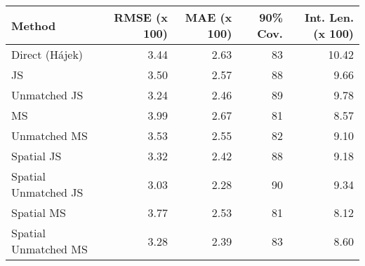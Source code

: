 
\begin{tabular}{lrrrr}
\toprule
Method & RMSE (x 100) & MAE (x 100) & 90\% Cov. & Int. Len. (x 100)\\
\midrule
Direct (Hájek) & 3.44 & 2.63 & 83 & 10.42\\
JS & 3.50 & 2.57 & 88 & 9.66\\
Unmatched JS & 3.24 & 2.46 & 89 & 9.78\\
MS & 3.99 & 2.67 & 81 & 8.57\\
Unmatched MS & 3.53 & 2.55 & 82 & 9.10\\
Spatial JS & 3.32 & 2.42 & 88 & 9.18\\
Spatial Unmatched JS & 3.03 & 2.28 & 90 & 9.34\\
Spatial MS & 3.77 & 2.53 & 81 & 8.12\\
Spatial Unmatched MS & 3.28 & 2.39 & 83 & 8.60\\
\bottomrule
\end{tabular}
